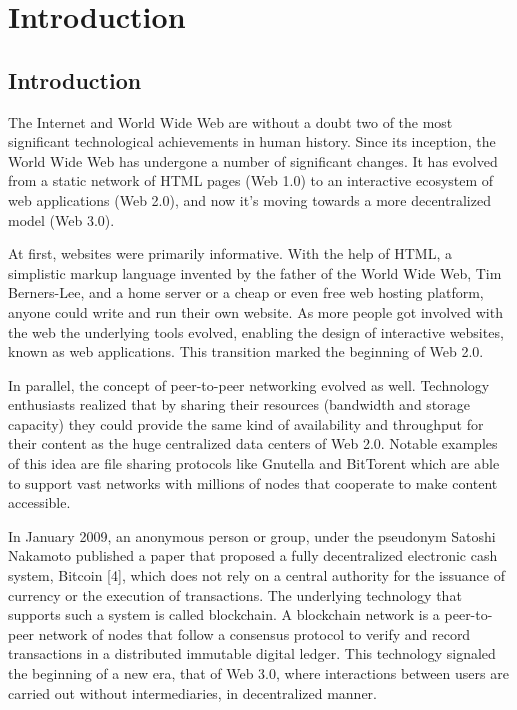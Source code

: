 \chapter{Introduction}\label{chapter:introduction}

\section{Introduction}\label{sec:intro}
The Internet and World Wide Web are without a doubt two of the most significant technological achievements in human history. Since its inception, the World Wide Web has undergone a number of significant changes. It has evolved from a static network of HTML pages (Web 1.0) to an interactive ecosystem of web applications (Web 2.0), and now it's moving towards a more decentralized model (Web 3.0).

At first, websites were primarily informative. With the help of HTML, a simplistic markup language invented by the father of the World Wide Web, Tim Berners-Lee, and a home server or a cheap or even free web hosting platform, anyone could write and run their own website. As more people got involved with the web the underlying tools evolved, enabling the design of interactive websites, known as web applications. This transition marked the beginning of Web 2.0. 

In parallel, the concept of peer-to-peer networking evolved as well. Technology enthusiasts realized that by sharing their resources (bandwidth and storage capacity) they could provide the same kind of availability and throughput for their content as the huge centralized data centers of Web 2.0. Notable examples of this idea are file sharing protocols like Gnutella and BitTorent which are able to support vast networks with millions of nodes that cooperate to make content accessible. 

In January 2009, an anonymous person or group, under the pseudonym Satoshi Nakamoto published a paper that proposed a fully decentralized electronic cash system, Bitcoin [4], which does not rely on a central authority for the issuance of currency or the execution of transactions. The underlying technology that supports such a system is called blockchain. A blockchain network is a peer-to-peer network of nodes that follow a consensus protocol to verify and record transactions in a distributed immutable digital ledger. This technology signaled the beginning of a new era, that of Web 3.0, where interactions between users are carried out without intermediaries, in decentralized manner.

